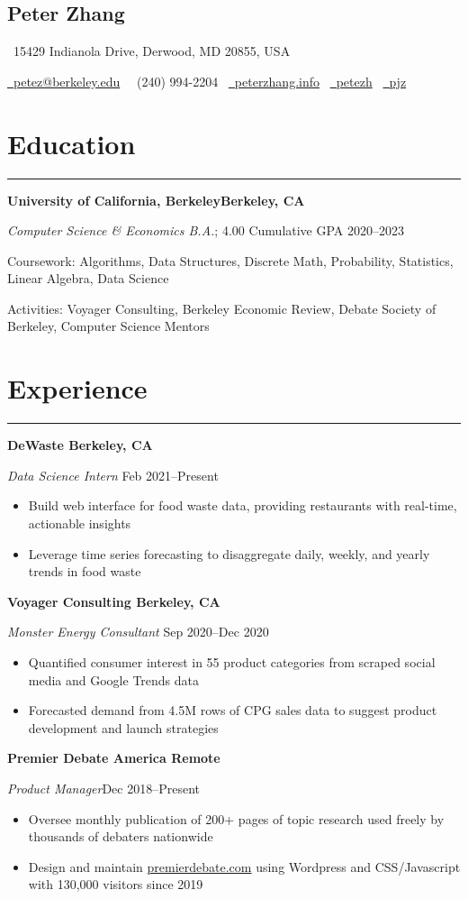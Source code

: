 \documentclass[11pt]{article}
\newcommand{\name}[1]{\begin{center}\section*{\huge \color{highlight} #1}\vspace{-0.5cm}\end{center}}
\newcommand{\topinfo}[1]{\begin{center}\vspace{-0.2cm}#1\vspace{-0.2cm}\end{center}}
\newcommand{\resumesection}[1]{\vspace{-0.6cm}\section*{\color{highlight}#1}\vspace{-0.3cm}\hrule\vspace{0.2cm}}
\begin{document}
\name{Peter Zhang}
\topinfo{\faHome \ 15429 Indianola Drive, Derwood, MD 20855, USA}
\topinfo{\href{mailto:petez@berkeley.edu}{\faEnvelope \ petez@berkeley.edu} \ \faPhone \ (240) 994-2204 \ \href{https://peterzhang.info/}{\faBriefcase \ peterzhang.info} \  \href{https://github.com/petezh}{\faGithub \ petezh} \  \href{https://www.linkedin.com/in/pjz/}{\faLinkedinSquare \ pjz}}

\resumesection{Education}

\textbf{University of California, Berkeley\hfill Berkeley, CA} \par
\textit{Computer Science \& Economics B.A.}; 4.00 Cumulative GPA \hfill 2020--2023\par
Coursework: Algorithms, Data Structures, Discrete Math, Probability, Statistics, Linear Algebra, Data Science\par
Activities: Voyager Consulting, Berkeley Economic Review, Debate Society of Berkeley, Computer Science Mentors

\resumesection{Experience}


\textbf{DeWaste \hfill Berkeley, CA}\par

\textit{Data Science Intern} \hfill Feb 2021--Present
\begin{itemize}
	\item Build web interface for food waste data, providing restaurants with real-time, actionable insights
	\item Leverage time series forecasting to disaggregate daily, weekly, and yearly trends in food waste
\end{itemize}\par

\textbf{Voyager Consulting \hfill Berkeley, CA}\par

\textit{Monster Energy Consultant} \hfill Sep 2020--Dec 2020
\begin{itemize}
	\item Quantified consumer interest in 55 product categories from scraped social media and Google Trends data
	\item Forecasted demand from 4.5M rows of CPG sales data to suggest product development and launch strategies
\end{itemize}\par

\textbf{Premier Debate America \hfill Remote} \par

\textit{Product Manager}\hfill Dec 2018--Present
\begin{itemize}
	\item Oversee monthly publication of 200+ pages of topic research used freely by thousands of debaters nationwide
	\item Design and maintain \href{https://www.premierdebate.com/briefs/}{premierdebate.com} using Wordpress and CSS/Javascript with 130,000 visitors since 2019
\end{itemize}\vspace{0.1cm}
\end{document}
